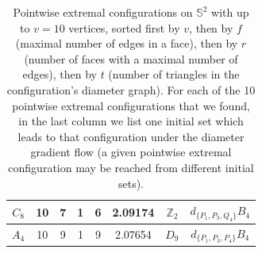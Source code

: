 \documentclass[12pt]{amsart}
\theoremstyle{plain}
\newcommand{\Sp}{\mathbb{S}}
\numberwithin{equation}{section}
\begin{document}
\begin{table}[!ht]
\begin{tabular}{|c|c|c|c|c|c|c|c|}
		$C_8$ & 10 & 7 & 1 & 6 & 2.09174  & $\mathbb{Z}_2$ & $d_{\{P_1, P_3, Q_4\}}B_4$            \\ \hline
		$A_4$ & 10  & 9 & 1 & 9 & 2.07654  & $D_9$          & $d_{\{P_1, P_3, P_4\}}B_4$                         \\ \hline
	\end{tabular}
	\caption{\label{tbl:pointwise extremal configurations_S2} Pointwise extremal configurations on $\Sp^2$ with up to $v=10$ vertices, sorted first by $v$, then by $f$ (maximal number of edges in a face), then by $r$ (number of faces with a maximal number of edges), then by $t$ (number of triangles in the configuration's diameter graph). For each of the 10 pointwise extremal configurations that we found, in the last column we list one initial set which leads to that configuration under the diameter gradient flow (a given pointwise extremal configuration may be reached from different initial sets).}
\end{table}
\end{document}

